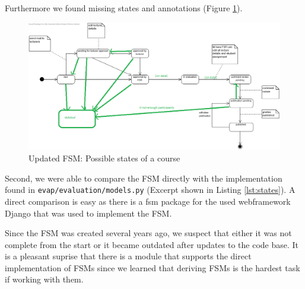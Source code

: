Furthermore we found missing states and annotations (Figure \ref{fig:new-states}).

\begin{figure}[h]
    \centering
    \includegraphics[width=\textwidth, keepaspectratio]{graphics/new_states_of_a_course}
    \caption{Updated FSM: Possible states of a course}
    \label{fig:new-states}
\end{figure}

Second, we were able to compare the FSM directly with the implementation found in \texttt{evap/evaluation/models.py} (Excerpt shown in Listing \ref{lst:states}).
A direct comparison is easy as there is a fsm package for the used webframework Django that was used to implement the FSM.



Since the FSM was created several years ago, we suspect that either it was not complete from the start or it became outdated after updates to the code base.  
It is a pleasant suprise that there is a module that supports the direct implementation of FSMs since we learned that deriving FSMs is the hardest task if working with them.
